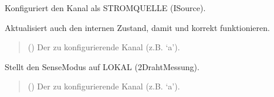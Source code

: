 \documentclass[letterpaper,10pt,english]{sphinxmanual}
\begin{document}
\begin{fulllineitems}
\begin{fulllineitems}
\label{\detokenize{modulab/smu_manager:modules.smu.SmuManager.SmuManager.set_source_current}}
\pysigstartsignatures
\pysiglinewithargsret
{}
{}
{}
\pysigstopsignatures
\sphinxAtStartPar
Konfiguriert den Kanal als STROMQUELLE (I\sphinxhyphen{}Source).

\sphinxAtStartPar
Aktualisiert auch den internen Zustand, damit 
und  korrekt funktionieren.
\begin{quote}\begin{description}
\sphinxAtStartPar
{} () \textendash{} Der zu konfigurierende Kanal (z.B. ‘a’).

\end{description}\end{quote}

\end{fulllineitems}


\begin{fulllineitems}
\label{\detokenize{modulab/smu_manager:modules.smu.SmuManager.SmuManager.set_sense_local}}
\pysigstartsignatures
\pysiglinewithargsret
{}
{}
{}
\pysigstopsignatures
\sphinxAtStartPar
Stellt den Sense\sphinxhyphen{}Modus auf LOKAL (2\sphinxhyphen{}Draht\sphinxhyphen{}Messung).
\begin{quote}\begin{description}
\sphinxAtStartPar
{} () \textendash{} Der zu konfigurierende Kanal (z.B. ‘a’).

\end{description}\end{quote}

\end{fulllineitems}



\end{fulllineitems}
\end{document}
